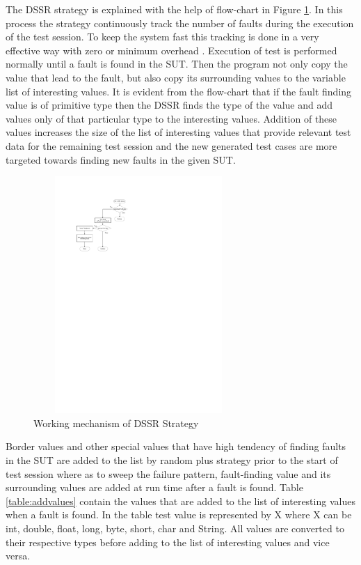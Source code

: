 \documentclass[conference]{IEEEtran}
\begin{document}
\hspace{10 mm}The DSSR strategy is explained with the help of flow-chart in Figure \ref{fig:Working_DSSS}. In this process the strategy continuously track the number of faults during the execution of the test session. To keep the system fast this tracking is done in a very effective way with zero or minimum overhead \cite{Leitner2009}. Execution of test is performed normally until a fault is found in the SUT. Then the program not only copy the value that lead to the fault, but also copy its surrounding values to the variable list of interesting values. It is evident from the flow-chart that if the fault finding value is of primitive type then the DSSR finds the type of the value and add values only of that particular type to the interesting values. Addition of these values increases the size of the list of interesting values that provide relevant test data for the remaining test session and the new generated test cases are more targeted towards finding new faults in the given SUT.\\
\begin{figure}[ht]
\centering
\includegraphics[width=8cm,height=9cm]{flowchart1.pdf}
\caption{Working mechanism of DSSR Strategy}
\label{fig:Working_DSSS}
\end{figure}

Border values and other special values that have high tendency of finding faults in the SUT are added to the list by random plus strategy prior to the start of test session where as to sweep the failure pattern, fault-finding value and its surrounding values are added at run time after a fault is found. Table \ref{table:addvalues} contain the values that are added to the list of interesting values when a fault is found. In the table test value is represented by X where X can be int, double, float, long, byte, short, char and String. All values are converted to their respective types before adding to the list of interesting values and vice versa.
\end{document}
